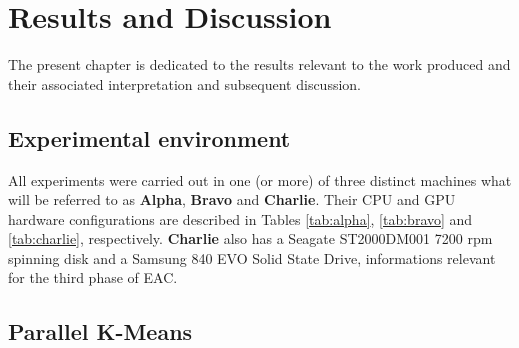 
\chapter{Results and Discussion}
\label{chapter:results}

The present chapter is dedicated to the results relevant to the work produced and their associated interpretation and subsequent discussion.

%

%
%

\section{Experimental environment}
\label{sec:system configs}

All experiments were carried out in one (or more) of three distinct machines what will be referred to as \textbf{Alpha}, \textbf{Bravo} and \textbf{Charlie}.
Their CPU and GPU hardware configurations are described in Tables \ref{tab:alpha}, \ref{tab:bravo} and \ref{tab:charlie}, respectively.
\textbf{Charlie} also has a Seagate ST2000DM001 7200 rpm spinning disk and a Samsung 840 EVO Solid State Drive, informations relevant for the third phase of EAC.%







%
%

\section{Parallel K-Means}
\label{sec:parallel kmeans}

